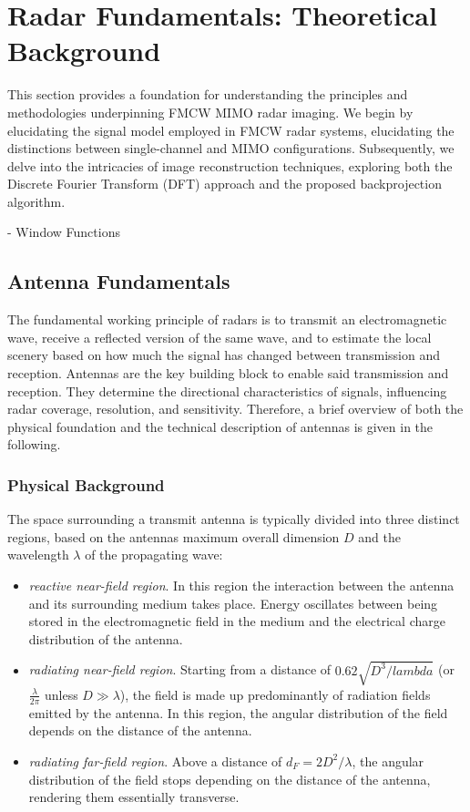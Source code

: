 \chapter{Radar Fundamentals: Theoretical Background}
This section provides a foundation for understanding the principles and methodologies underpinning FMCW MIMO radar imaging.
We begin by elucidating the signal model employed in FMCW radar systems,
elucidating the distinctions between single-channel and MIMO configurations.
Subsequently, we delve into the intricacies of image reconstruction techniques,
exploring both the Discrete Fourier Transform (DFT) approach and the proposed backprojection algorithm.

- Window Functions
\section{Antenna Fundamentals}

The fundamental working principle of radars is to transmit an electromagnetic wave,
receive a reflected version of the same wave,
and to estimate the local scenery based on how much the signal has changed between transmission and reception.
Antennas are the key building block to enable said transmission and reception.
They determine the directional characteristics of signals,
influencing radar coverage, resolution, and sensitivity.
Therefore, a brief overview of both the physical foundation
and the technical description of antennas is given in the following.

\subsection{Physical Background}

The space surrounding a transmit antenna is typically divided into three distinct regions,
based on the antennas maximum overall dimension $D$ and the wavelength $\lambda$ of the propagating wave:
\begin{itemize}
    \item \emph{reactive near-field region}.
          In this region the interaction between the antenna and its surrounding medium takes place.
          Energy oscillates between being stored in the electromagnetic field in the medium
          and the electrical charge distribution of the antenna.

    \item \emph{radiating near-field region}.
          Starting from a distance of $0.62\sqrt{D^3/lambda}$ (or $\frac{\lambda}{2\pi}$ unless $D\gg\lambda$),
          the field is made up predominantly of radiation fields emitted by the antenna.
          In this region, the angular distribution of the field depends on the distance of the antenna.

    \item \emph{radiating far-field region}.
          Above a distance of $d_F = 2D^2/\lambda$,
          the angular distribution of the field stops depending on the distance of the antenna,
          rendering them essentially transverse.
\end{itemize}


